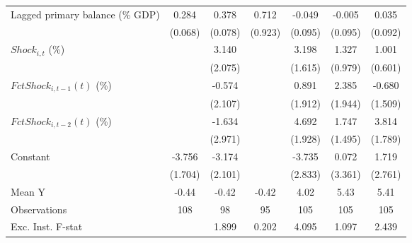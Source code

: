 {\begin{tabular}{l*{6}{c}}
\addlinespace
Lagged primary balance (\% GDP)&       0.284\sym{***}&       0.378\sym{***}&       0.712         &      -0.049         &      -0.005         &       0.035         \\
                    &     (0.068)         &     (0.078)         &     (0.923)         &     (0.095)         &     (0.095)         &     (0.092)         \\
\addlinespace
$ Shock_{i,t}$ (\%) &                     &       3.140         &                     &       3.198\sym{*}  &       1.327         &       1.001         \\
                    &                     &     (2.075)         &                     &     (1.615)         &     (0.979)         &     (0.601)         \\
\addlinespace
$ FctShock_{i,t-1}(t)$ (\%)&                     &      -0.574         &                     &       0.891         &       2.385         &      -0.680         \\
                    &                     &     (2.107)         &                     &     (1.912)         &     (1.944)         &     (1.509)         \\
\addlinespace
$ FctShock_{i,t-2}(t)$ (\%)&                     &      -1.634         &                     &       4.692\sym{**} &       1.747         &       3.814\sym{*}  \\
                    &                     &     (2.971)         &                     &     (1.928)         &     (1.495)         &     (1.789)         \\
\addlinespace
Constant            &      -3.756\sym{**} &      -3.174         &                     &      -3.735         &       0.072         &       1.719         \\
                    &     (1.704)         &     (2.101)         &                     &     (2.833)         &     (3.361)         &     (2.761)         \\
\midrule
Mean Y              &       -0.44         &       -0.42         &       -0.42         &        4.02         &        5.43         &        5.41         \\
Observations        &         108         &          98         &          95         &         105         &         105         &         105         \\
Exc. Inst. F-stat   &                     &       1.899         &       0.202         &       4.095         &       1.097         &       2.439         \\
\bottomrule
\end{tabular}
}
